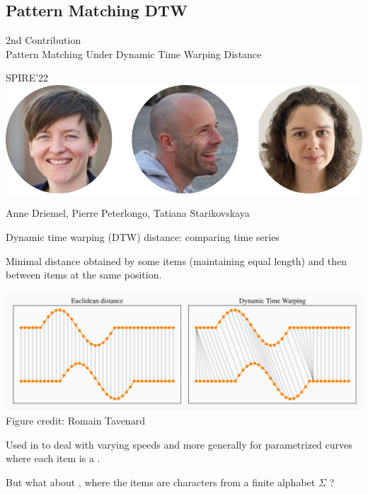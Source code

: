 \subsection{Pattern Matching DTW}

\newcommand{\dtw}{\mathrm{DTW}}
\newcommand{\ed}{\mathrm{ED}}
\newcommand{\RLE}{\mathrm{RLE}}


\begin{frame}
    \centering
    {\large 2nd Contribution}\\ 
    \medskip
    {\Large Pattern Matching Under Dynamic Time Warping Distance}
  
    \bigskip
    {\large SPIRE'22}\\
    \bigskip
    \includegraphics{pictures/mindmap/dtw.png}
  
    \bigskip
    Anne Driemel, Pierre Peterlongo, Tatiana Starikovskaya
\end{frame}


\begin{frame}{Dynamic time warping (DTW) distance: comparing time series}

 Minimal distance obtained by  some items (maintaining equal length) and then  between items at the same position.

\begin{center}
\includegraphics[scale=0.3]{figures/dtw_vs_euc.png}\\
\tiny{Figure credit: Romain Tavenard}
\end{center}
\pause
\small
Used in  to deal with varying speeds and more generally for parametrized curves where each item is a .\pause

\vfill
But what about , where the items are characters from a finite alphabet $\Sigma$ ?
\end{frame}

